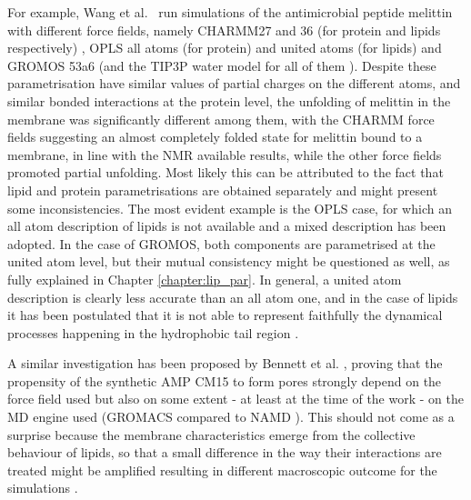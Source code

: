 For example, Wang et al.\ \cite{Wang2014} run simulations of the antimicrobial peptide melittin with different force fields, namely CHARMM27 and 36 (for protein and lipids respectively) \cite{MacKerell1998,Klauda2010}, OPLS all atoms (for protein) and united atoms (for lipids) \cite{Jorgensen1996} and GROMOS 53a6 \cite{Oostenbrink2004} (and the TIP3P water model for all of them \cite{Jorgensen1983}).
%
Despite these parametrisation have similar values of partial charges on the different atoms, and similar bonded interactions at the protein level, the unfolding of melittin in the membrane was significantly different among them, with the CHARMM force fields suggesting an almost completely folded state for melittin bound to a membrane, in line with the NMR available results, while the other force fields promoted partial unfolding. Most likely this can be attributed to the fact that lipid and protein parametrisations are obtained separately and might present some inconsistencies. The most evident example is the OPLS case, for which an all atom description of lipids is not available and a mixed description has been adopted. In the case of GROMOS, both components are parametrised at the united atom level, but their mutual consistency might be questioned as well, as fully explained in Chapter \ref{chapter:lip_par}. In general, a united atom description is clearly less accurate than an all atom one, and in the case of lipids it has been postulated that it is not able to represent faithfully the dynamical processes happening in the hydrophobic tail region \cite{Chowdhary2013}.

A similar investigation has been proposed by Bennett et al. \cite{Bennett2016}, proving that the propensity of the synthetic AMP CM15 to form pores strongly depend on the force field used but also on some extent - at least at the time of the work - on the MD engine used (GROMACS compared to NAMD \cite{Phillips2005}). This should not come as a surprise because the membrane characteristics emerge from the collective behaviour of lipids, so that a small difference in the way their interactions are treated might be amplified resulting in different macroscopic outcome for the simulations \cite{Reisser2017}.

